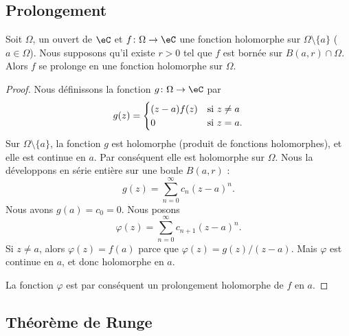 \subsection{Prolongement}

\begin{proposition}
    Soit \( \Omega\), un ouvert de \( \eC\) et \( f\colon \Omega\to \eC\) une fonction holomorphe sur \( \Omega\setminus\{ a \}\) (\( a\in \Omega\)). Nous supposons qu'il existe \( r>0\) tel que \( f\) est bornée sur \( B(a,r)\cap\Omega\). Alors \( f\) se prolonge en une fonction holomorphe sur \( \Omega\).
\end{proposition}

\begin{proof}
    Nous définissons la fonction \( g\colon \Omega\to \eC\) par
    \begin{equation}
        g(z)=\begin{cases}
            (z-a)f(z)    &   \text{si \( z\neq a\)}\\
            0    &    \text{si \( z=a\)}.
        \end{cases}
    \end{equation}
    Sur \( \Omega\setminus\{ a \}\), la fonction \( g\) est holomorphe (produit de fonctions holomorphes), et elle est continue en \( a\). Par conséquent elle est holomorphe sur \( \Omega\). Nous la développons en série entière sur une boule \( B(a,r)\) :
    \begin{equation}
        g(z)=\sum_{n=0}^{\infty}c_n(z-a)^n.
    \end{equation}
    Nous avons \( g(a)=c_0=0\). Nous posons
    \begin{equation}
        \varphi(z)=\sum_{n=0}^{\infty}c_{n+1}(z-a)^n.
    \end{equation}
    Si \( z\neq a\), alors \( \varphi(z)=f(a)\) parce que \( \varphi(z)=g(z)/(z-a)\). Mais \( \varphi\) est continue en \( a\), et donc holomorphe en \( a\).

    La fonction \( \varphi\) est par conséquent un prolongement holomorphe de \( f\) en \( a\).
\end{proof}

\subsection{Théorème de Runge}


